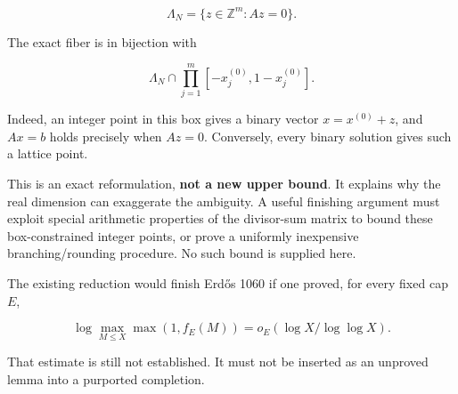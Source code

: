 \[
\Lambda_N=\{z\in\mathbb Z^m:Az=0\}.
\]

The exact fiber is in bijection with

\[
\Lambda_N\cap\prod_{j=1}^m[-x_j^{(0)},1-x_j^{(0)}].
\]

Indeed, an integer point in this box gives a binary vector \(x=x^{(0)}+z\), and \(Ax=b\) holds precisely when \(Az=0\). Conversely, every binary solution gives such a lattice point.

This is an exact reformulation, \textbf{not a new upper bound}. It explains why the real dimension can exaggerate the ambiguity. A useful finishing argument must exploit special arithmetic properties of the divisor-sum matrix to bound these box-constrained integer points, or prove a uniformly inexpensive branching/rounding procedure. No such bound is supplied here.

The existing reduction would finish Erdős 1060 if one proved, for every fixed cap \(E\),

\[
\log\max_{M\le X}\max(1,f_E(M))=o_E(\log X/\log\log X).
\]

That estimate is still not established. It must not be inserted as an unproved lemma into a purported completion.
